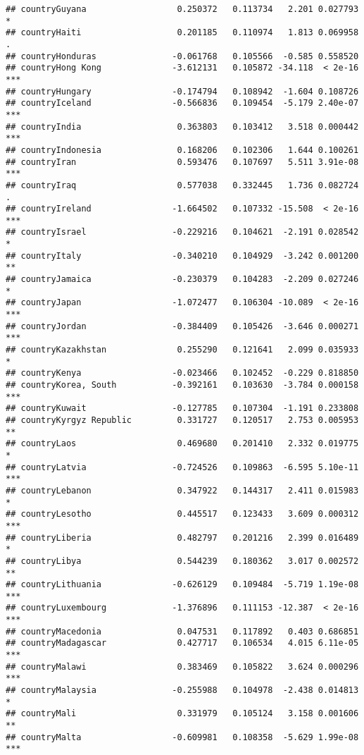 \documentclass[
  11pt,
]{article}
\begin{document}
\begin{verbatim}
## countryGuyana                  0.250372   0.113734   2.201 0.027793 *  
## countryHaiti                   0.201185   0.110974   1.813 0.069958 .  
## countryHonduras               -0.061768   0.105566  -0.585 0.558520    
## countryHong Kong              -3.612131   0.105872 -34.118  < 2e-16 ***
## countryHungary                -0.174794   0.108942  -1.604 0.108726    
## countryIceland                -0.566836   0.109454  -5.179 2.40e-07 ***
## countryIndia                   0.363803   0.103412   3.518 0.000442 ***
## countryIndonesia               0.168206   0.102306   1.644 0.100261    
## countryIran                    0.593476   0.107697   5.511 3.91e-08 ***
## countryIraq                    0.577038   0.332445   1.736 0.082724 .  
## countryIreland                -1.664502   0.107332 -15.508  < 2e-16 ***
## countryIsrael                 -0.229216   0.104621  -2.191 0.028542 *  
## countryItaly                  -0.340210   0.104929  -3.242 0.001200 ** 
## countryJamaica                -0.230379   0.104283  -2.209 0.027246 *  
## countryJapan                  -1.072477   0.106304 -10.089  < 2e-16 ***
## countryJordan                 -0.384409   0.105426  -3.646 0.000271 ***
## countryKazakhstan              0.255290   0.121641   2.099 0.035933 *  
## countryKenya                  -0.023466   0.102452  -0.229 0.818850    
## countryKorea, South           -0.392161   0.103630  -3.784 0.000158 ***
## countryKuwait                 -0.127785   0.107304  -1.191 0.233808    
## countryKyrgyz Republic         0.331727   0.120517   2.753 0.005953 ** 
## countryLaos                    0.469680   0.201410   2.332 0.019775 *  
## countryLatvia                 -0.724526   0.109863  -6.595 5.10e-11 ***
## countryLebanon                 0.347922   0.144317   2.411 0.015983 *  
## countryLesotho                 0.445517   0.123433   3.609 0.000312 ***
## countryLiberia                 0.482797   0.201216   2.399 0.016489 *  
## countryLibya                   0.544239   0.180362   3.017 0.002572 ** 
## countryLithuania              -0.626129   0.109484  -5.719 1.19e-08 ***
## countryLuxembourg             -1.376896   0.111153 -12.387  < 2e-16 ***
## countryMacedonia               0.047531   0.117892   0.403 0.686851    
## countryMadagascar              0.427717   0.106534   4.015 6.11e-05 ***
## countryMalawi                  0.383469   0.105822   3.624 0.000296 ***
## countryMalaysia               -0.255988   0.104978  -2.438 0.014813 *  
## countryMali                    0.331979   0.105124   3.158 0.001606 ** 
## countryMalta                  -0.609981   0.108358  -5.629 1.99e-08 ***

\end{verbatim}
\end{document}
